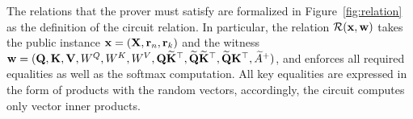 \documentclass[letterpaper,twocolumn,10pt]{article}
\begin{document}
The relations that the prover must satisfy are formalized in Figure~\ref{fig:relation} as the definition of the circuit relation. In particular, the relation ${\mathcal{R}}({\mathbf{x}},{\mathbf{w}})$ takes the public instance ${\mathbf{x}}=({\mathbf{X}},{\mathbf{r}}_n,{\mathbf{r}}_k)$ and the witness ${\mathbf{w}}=({\mathbf{Q}},{\mathbf{K}},{\mathbf{V}}, W^Q, W^K, W^V, {\mathbf{Q}}\widetilde{{\mathbf{K}}}^\top, \widetilde{{\mathbf{Q}}}\widetilde{{\mathbf{K}}}^\top, \widetilde{{\mathbf{Q}}}{\mathbf{K}}^\top, \widetilde{A}^+)$, and enforces all required equalities as well as the softmax computation. All key equalities are expressed in the form of products with the random vectors, accordingly, the circuit computes only vector inner products.


\begin{figure}[t!]
\center
{}
\end{figure}
\end{document}
